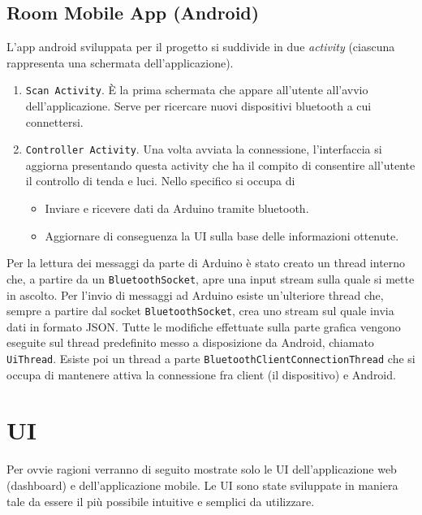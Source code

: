 \documentclass[a4paper,12pt]{report}
\begin{document}
\subsection{Room Mobile App (Android)}
L'app android sviluppata per il progetto si suddivide in due \emph{activity} (ciascuna rappresenta una schermata dell'applicazione).
\begin{enumerate}
    \item \texttt{Scan Activity}. È la prima schermata che appare all'utente all'avvio dell'applicazione. Serve per ricercare nuovi dispositivi bluetooth a cui connettersi.
    \item \texttt{Controller Activity}. Una volta avviata la connessione, l'interfaccia si aggiorna presentando questa activity che ha il compito di consentire all'utente il controllo di tenda e luci. Nello specifico si occupa di
    \begin{itemize}
        \item Inviare e ricevere dati da Arduino tramite bluetooth.
        \item Aggiornare di conseguenza la UI sulla base delle informazioni ottenute.
    \end{itemize}
\end{enumerate}
Per la lettura dei messaggi da parte di Arduino è stato creato un thread interno che, a partire da un \texttt{BluetoothSocket}, apre una input stream sulla quale si mette in ascolto. 
Per l'invio di messaggi ad Arduino esiste un'ulteriore thread che, sempre a partire dal socket \texttt{BluetoothSocket}, crea uno stream sul quale invia dati in formato JSON.
Tutte le modifiche effettuate sulla parte grafica vengono eseguite sul thread predefinito messo a disposizione da Android, chiamato \texttt{UiThread}.
Esiste poi un thread a parte \texttt{BluetoothClientConnectionThread} che si occupa di mantenere attiva la connessione fra client (il dispositivo) e Android.


\section{UI}
Per ovvie ragioni verranno di seguito mostrate solo le UI dell'applicazione web (dashboard) e dell'applicazione mobile.
Le UI sono state sviluppate in maniera tale da essere il più possibile intuitive e semplici da utilizzare.
\end{document}
